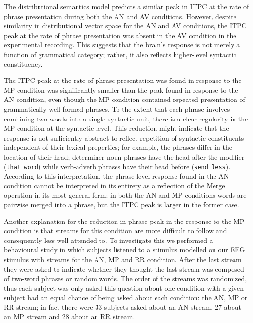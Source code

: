 \documentclass[10pt,letterpaper]{article}
\newcommand{\citet}[1]{\cite{#1}}
\begin{document}
The distributional semantics model predicts a similar peak in ITPC at
the rate of phrase presentation during both the AN and AV
conditions. However, despite similarity in distributional vector space
for the AN and AV conditions, the ITPC peak at the rate of phrase
presentation was absent in the AV condition in the experimental
recording. This suggests that the brain's response is not merely a
function of grammatical category; rather, it also reflects
higher-level syntactic constituency.

The ITPC peak at the rate of phrase presentation was found in response
to the MP condition was significantly smaller than the peak found in
response to the AN condition, even though the MP condition contained
repeated presentation of grammatically well-formed phrases. To the
extent that each phrase involves combining two words into a single
syntactic unit, there is a clear regularity in the MP condition at the
syntactic level. This reduction might indicate that the response is
not sufficiently abstract to reflect repetition of syntactic
constituents independent of their lexical properties; for example, the
phrases differ in the location of their head; determiner-noun phrases
have the head after the modifier (\texttt{that word}) while
verb-adverb phrases have their head before (\texttt{send
  less}). According to this interpretation, the phrase-level response
found in the AN condition cannot be interpreted in its entirety as a
reflection of the Merge operation \citet{Chomsky1995} in its most
general form: in both the AN and MP conditions words are pairwise
merged into a phrase, but the ITPC peak is larger in the former case.

Another explanation for the reduction in phrase peak in the response
to the MP condition is that streams for this condition are more
difficult to follow and consequently less well attended to. To
investigate this we performed a behavioural study in which subjects
listened to a stimulus modelled on our EEG stimulus with streams for
the AN, MP and RR condition. After the last stream they were asked to
indicate whether they thought the last stream was composed of two-word
phrases or random words. The order of the streams was randomized, thus
each subject was only asked this question about one condition with a
given subject had an equal chance of being asked about each condition:
the AN, MP or RR stream; in fact there were 33 subjects asked about an
AN stream, 27 about an MP stream and 28 about an RR stream.
\end{document}
